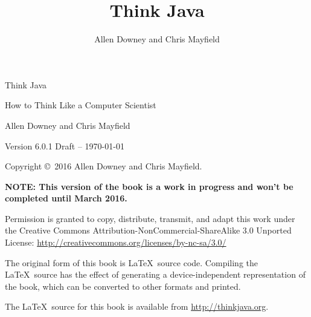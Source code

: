\documentclass[12pt]{book}
\title{Think Java}
\author{Allen Downey and Chris Mayfield}
\newcommand{\theauthors}{Allen Downey and Chris Mayfield}
\newcommand{\theversion}{Version 6.0.1 Draft -- \today}
\theoremstyle{exercise}
\newif\ifplastex
\begin{document}
\frontmatter

\ifplastex
    \maketitle

\else

\pagebreak
\thispagestyle{empty}

\begin{flushright}
\vspace*{2.0in}

{\huge Think Java}

\vspace{0.25in}
{\LARGE How to Think Like a Computer Scientist}

\vspace{1in}
{\Large \theauthors}

\vspace{1in}
{\large \theversion}

\vfill

\end{flushright}

\pagebreak
\thispagestyle{empty}

Copyright \copyright ~2016 Allen Downey and Chris Mayfield.

{\bf NOTE: This version of the book is a work in progress and won't be completed until March 2016.}

\vspace{0.25in}

Permission is granted to copy, distribute, transmit, and adapt this work under the Creative Commons Attribution-NonCommercial-ShareAlike 3.0 Unported License: \url{http://creativecommons.org/licenses/by-nc-sa/3.0/}

The original form of this book is \LaTeX\ source code.
Compiling the \LaTeX\ source has the effect of generating a device-independent representation of the book, which can be converted to other formats and printed.

The \LaTeX\ source for this book is available from \url{http://thinkjava.org}.


\cleardoublepage
\setcounter{tocdepth}{1}
\tableofcontents

\fi
\end{document}
